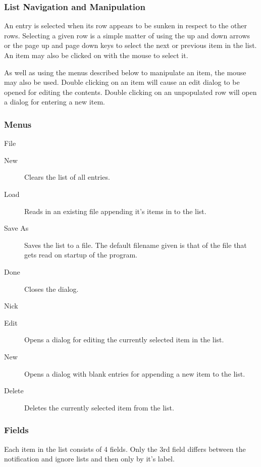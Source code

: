 \documentclass[titlepage]{article}
\begin{document}
\subsubsection{List Navigation and Manipulation}
An entry is selected when its row appears to be sunken in respect to the
other rows. Selecting a given row is a simple matter of using the up and
down arrows or the page up and page down keys to select the next or
previous item in the list. An item may also be clicked on with the mouse to
select it.

As well as using the menus described below to manipulate an item, the
mouse may also be used. Double clicking on an item will cause an edit
dialog to be opened for editing the contents. Double clicking on an
unpopulated row will open a dialog for entering a new item.

\subsubsection{Menus}
\begin{description}
\item{File}
\begin{description}
\item[New] Clears the list of all entries.
\item[Load] Reads in an existing file appending it's items in to the
list.
\item[Save As] Saves the list to a file. The default filename given is that
of the file that gets read on startup of the program.
\item[Done] Closes the dialog.
\end{description}

\item{Nick}
\begin{description}
\item[Edit] Opens a dialog for editing the currently selected item in the
list.
\item[New] Opens a dialog with blank entries for appending a new item to
the list.
\item[Delete] Deletes the currently selected item from the list.
\end{description}
\end{description}

\subsubsection{Fields}
Each item in the list consists of 4 fields. Only the 3rd field differs
between the notification and ignore lists and then only by it's label.
\end{document}
